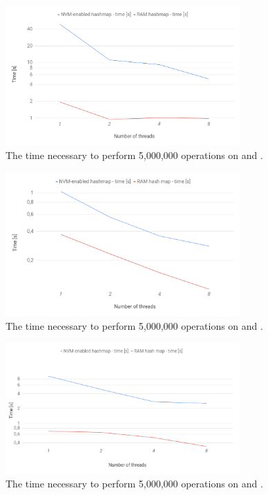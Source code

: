     \begin{figure}[ht]
        \centering
        \includegraphics[width=0.8\textwidth]{thesis/figures/insert.png}
        \caption{The time necessary to perform 5,000,000 \insertMethod operations on \PHT and \StandardHashMap.}
        \label{insertPlot}
    \end{figure}
    
    \begin{figure}[ht]
        \centering
        \includegraphics[width=0.8\textwidth]{thesis/figures/get.png}
        \caption{The time necessary to perform 5,000,000 \getMethod operations on \PHT and \StandardHashMap.}
        \label{getPlot}
    \end{figure}
    
    \begin{figure}[ht]
        \centering
        \includegraphics[width=0.8\textwidth]{thesis/figures/remove.png}
        \caption{The time necessary to perform 5,000,000 \removeMethod operations on \PHT and \StandardHashMap.}
        \label{removePlot}
    \end{figure}
    
